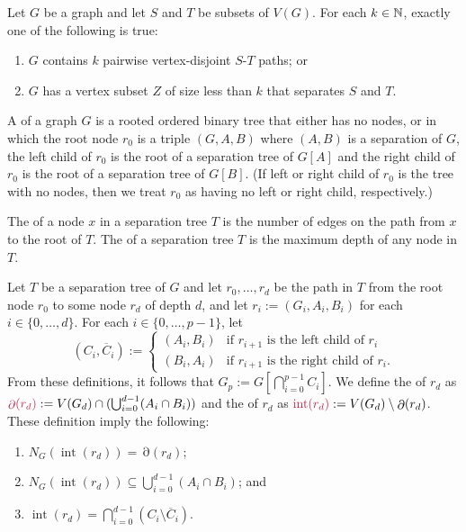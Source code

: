 \documentclass{patmorin}
\DeclareMathOperator{\interior}{int}
\DeclareMathOperator{\boundary}{\partial}
\begin{document}
\begin{thm}\label{menger}
  Let $G$ be a graph and let $S$ and $T$ be subsets of $V(G)$. For each $k\in\mathbb{N}$, exactly one of the following is true:
  \begin{enumerate}[nosep,nolistsep,label=\rm(\roman*),ref=(\roman*)2]
      \item $G$ contains $k$ pairwise vertex-disjoint $S$-$T$ paths; or
      \item $G$ has a vertex subset $Z$ of size less than $k$ that separates $S$ and $T$.
  \end{enumerate}
\end{thm}

A  of a graph $G$ is a rooted ordered binary tree that either has no nodes, or in which the root node $r_0$ is a triple $(G,A,B)$ where $(A,B)$ is a separation of $G$, the left child of $r_0$ is the root of a separation tree of $G[A]$ and the right child of $r_0$ is the root of a separation tree of $G[B]$. (If left or right child of $r_0$ is the tree with no nodes, then we treat $r_0$ as having no left or right child, respectively.)

The  of a node $x$ in a separation tree $T$ is the number of edges on the path from $x$ to the root of $T$. 
 The  of a separation tree $T$ is the maximum depth of any node in $T$.

Let $T$ be a separation tree of $G$ and let $r_0,\ldots,r_d$ be the path in $T$ from the root node $r_0$ to some node $r_d$ of depth $d$, and let $r_i:=(G_i,A_i,B_i)$ for each $i\in\{0,\ldots,d\}$.  
For each $i\in\{0,\ldots,p-1\}$, let
\[
  (C_i,\overline{C}_i):=
  \begin{cases}
    (A_i,B_i) & \text{if $r_{i+1}$ is the left child of $r_{i}$} \\
    (B_i,A_i) & \text{if $r_{i+1}$ is the right child of $r_{i}$.}
  \end{cases}
\]
From these definitions, it follows that $G_p := G[\bigcap_{i=0}^{p-1} C_i]$.  
We define the  of $r_d$ as $\mathdefin{\boundary(r_d)}:=V(G_d)\cap(\bigcup_{i=0}^{d-1}(A_i\cap B_i))$ and the  of $r_d$ as $\mathdefin{\interior(r_d)}:=V(G_d) \setminus \boundary(r_d)$. These definition imply the following:
\begin{enumerate}[nosep,nolistsep,label=(T\arabic*)]
  \item $N_G(\interior(r_d))=\boundary(r_d)$;
  \item\label{small_boundary} $N_G(\interior(r_d))\subseteq \bigcup_{i=0}^{d-1}(A_i\cap B_i)$; and
  \item\label{small_interior} $\interior(r_d) = \bigcap_{i=0}^{d-1}(C_i\setminus\overline{C}_i)$.
\end{enumerate}
\end{document}
